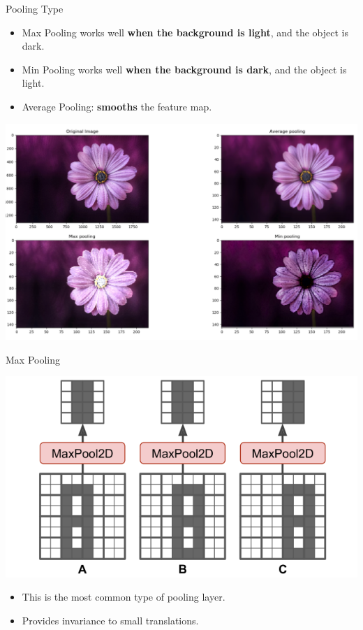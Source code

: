 \documentclass[default, aspectratio=169]{beamer}
\begin{document}
	\begin{frame}{Pooling Type}
		\begin{itemize}
			\item Max Pooling works well \textbf{when the background is light}, and the object is dark.
			\item Min Pooling works well \textbf{when the background is dark}, and the object is light.
			\item Average Pooling: \textbf{smooths} the feature map.
		\end{itemize}
		
		\centering
		\includegraphics[keepaspectratio, scale=0.15]{pic/Pooling_3.png}
	\end{frame}
	\begin{frame}{Max Pooling}
		
		\centering
		\includegraphics[keepaspectratio, scale=0.3]{pic/Pooling_4.png}
		\bigskip
		\begin{itemize}
			\item This is the most common type of pooling layer.
			\item Provides invariance to small translations.
		\end{itemize}
		
	\end{frame}
\end{document}
